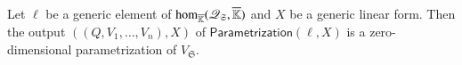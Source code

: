 \documentclass[final,1p,times,authoryear]{elsarticle}
\newcommand{\minpoly}{P}
\newcommand{\lf}{X}
\newcommand{\residueI}{\mathscr{Q}}
\newcommand{\sqfree}{Q}
\def\Kbar {{\ensuremath{\overline{\mathbb{K}}}}}
\begin{document}
\begin{lemma}
  \label{lemma:para2}
  Let $\ell$ be a generic element of ${\rm
  hom}_{\Kbar}(\residueI_\mathfrak{S},\Kbar)$ and $\lf$ be a generic
  linear form. Then the output $((\sqfree,V_1,\dots,V_n),\lf)$ of
  $\mathsf{Parametrization}(\ell,\lf)$ is a zero-dimensional
  parametrization of $V_{\mathfrak{S}}$.
\end{lemma}


\end{document}
